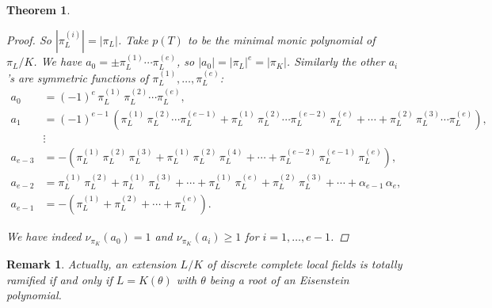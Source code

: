 \documentclass{article}
\theoremstyle{myplain}
\newtheorem{theorem}[proposition]{Theorem}
\theoremstyle{mydefinition}
\newtheorem{remark}[proposition]{Remark}
\begin{document}
\begin{theorem}
\begin{proof}[Proof]
    So $|\pi_L^{(i)}| = |\pi_L|$. Take $p (T)$ to be the minimal monic
    polynomial of $\pi_L / K$. We have
    $a_0 = \pm \pi_L^{(1)} \cdots \pi_L^{(e)}$, so
    $|a_0| = |\pi_L|^e = |\pi_K|$. Similarly the other $a_i$'s are symmetric
    functions of $\pi_L^{(1)}, \ldots, \pi_L^{(e)}$:
    \begin{align*}
      a_0 & = (-1)^e \, \pi_L^{(1)} \, \pi_L^{(2)} \cdots \pi_L^{(e)},\\
      a_1 & = (-1)^{e-1} \, (\pi_L^{(1)} \, \pi_L^{(2)} \cdots \pi_L^{(e-1)} +
            \pi_L^{(1)} \, \pi_L^{(2)} \cdots \pi_L^{(e-2)}\,\pi_L^{(e)} +
            \cdots +
            \pi_L^{(2)} \, \pi_L^{(3)} \cdots \pi_L^{(e)}), \\
          & \vdots \\
      a_{e-3} & = -(\pi_L^{(1)}\,\pi_L^{(2)}\,\pi_L^{(3)} +
                \pi_L^{(1)}\,\pi_L^{(2)}\,\pi_L^{(4)} + \cdots +
                \pi_L^{(e-2)}\,\pi_L^{(e-1)}\,\pi_L^{(e)}), \\
      a_{e-2} & = \pi_L^{(1)}\,\pi_L^{(2)} + \pi_L^{(1)}\,\pi_L^{(3)} + \cdots +
                \pi_L^{(1)}\,\pi_L^{(e)} +
                \pi_L^{(2)}\,\pi_L^{(3)} + \cdots +
                \alpha_{e-1}\,\alpha_e, \\
      a_{e-1} & = -(\pi_L^{(1)} + \pi_L^{(2)} + \cdots + \pi_L^{(e)}).
    \end{align*}

    We have indeed $\nu_{\pi_K} (a_0) = 1$ and $\nu_{\pi_K} (a_i) \ge 1$ for
    $i = 1, \ldots, e-1$.
  \end{proof}
\end{theorem}

\begin{remark}
  Actually, an extension $L/K$ of discrete complete local fields is totally
  ramified \emph{if and only if} $L = K (\theta)$ with $\theta$ being a root of
  an Eisenstein polynomial.
\end{remark}
\end{document}

